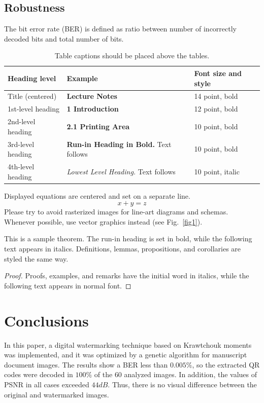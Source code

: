 \documentclass[runningheads]{llncs}
\begin{document}
\subsection{Robustness}
The bit error rate (BER) is defined as ratio between number of incorrectly decoded bits and total number of bits.

\begin{table}
\caption{Table captions should be placed above the
tables.}\label{tab1}
\begin{tabular}{|l|l|l|}
\hline
Heading level &  Example & Font size and style\\
\hline
Title (centered) &  {\Large\bfseries Lecture Notes} & 14 point, bold\\
1st-level heading &  {\large\bfseries 1 Introduction} & 12 point, bold\\
2nd-level heading & {\bfseries 2.1 Printing Area} & 10 point, bold\\
3rd-level heading & {\bfseries Run-in Heading in Bold.} Text follows & 10 point, bold\\
4th-level heading & {\itshape Lowest Level Heading.} Text follows & 10 point, italic\\
\hline
\end{tabular}
\end{table}


\noindent Displayed equations are centered and set on a separate
line.
\begin{equation}
x + y = z
\end{equation}
Please try to avoid rasterized images for line-art diagrams and
schemas. Whenever possible, use vector graphics instead (see
Fig.~\ref{fig1}).

\begin{theorem}
This is a sample theorem. The run-in heading is set in bold, while
the following text appears in italics. Definitions, lemmas,
propositions, and corollaries are styled the same way.
\end{theorem}
%
%
\begin{proof}
Proofs, examples, and remarks have the initial word in italics,
while the following text appears in normal font.
\end{proof}
\section{Conclusions}
In this paper, a digital watermarking technique based on Krawtchouk moments was implemented, and it was optimized by a genetic algorithm for manuscript document images. The results show a BER less than $0.005 \%$, so the extracted QR codes were decoded in $100\%$ of the $60$ analyzed images. In addition, the values of PSNR in all cases exceeded $44dB$. Thus, there is no visual difference between the original and watermarked images.
\end{document}
